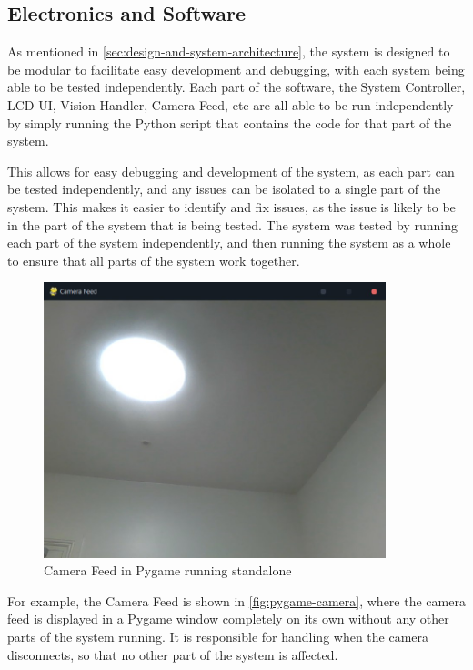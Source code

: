 \subsection{Electronics and Software}
\label{sec:electronics-and-software-evaluation}
As mentioned in \autoref{sec:design-and-system-architecture}, the system is designed to be modular to facilitate easy development and debugging, with each system being able to be tested independently. Each part of the software, the System Controller, LCD UI, Vision Handler, Camera Feed, etc are all able to be run independently by simply running the Python script that contains the code for that part of the system.

This allows for easy debugging and development of the system, as each part can be tested independently, and any issues can be isolated to a single part of the system. This makes it easier to identify and fix issues, as the issue is likely to be in the part of the system that is being tested. The system was tested by running each part of the system independently, and then running the system as a whole to ensure that all parts of the system work together.

\begin{figure}[H]
  \centering
  \includegraphics[height=8cm]{imgs/software/pygamecamera.jpg}
  \caption{Camera Feed in Pygame running standalone}
  \label{fig:pygame-camera}
\end{figure}

For example, the Camera Feed is shown in \autoref{fig:pygame-camera}, where the camera feed is displayed in a Pygame window completely on its own without any other parts of the system running. It is responsible for handling when the camera disconnects, so that no other part of the system is affected. 

